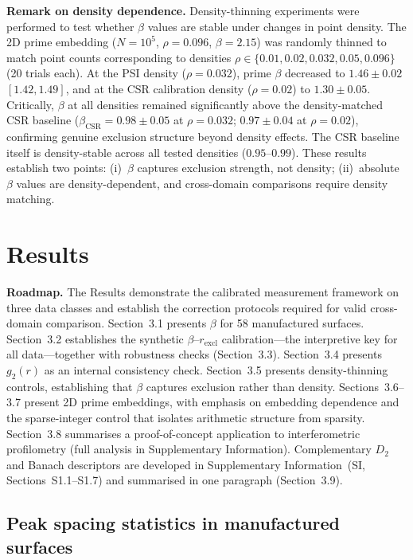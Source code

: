 \documentclass[final,3p,times,twocolumn]{elsarticle}
\theoremstyle{definition}
\begin{document}
\textbf{Remark on density dependence.} Density-thinning experiments were
performed to test whether $\beta$ values are stable under changes in
point density. The 2D prime embedding ($N=10^5$, $\rho=0.096$,
$\beta=2.15$) was randomly thinned to match point counts corresponding
to densities $\rho \in \{0.01, 0.02, 0.032, 0.05, 0.096\}$ (20 trials
each). At the PSI density ($\rho=0.032$), prime $\beta$ decreased to
$1.46\pm0.02$ $[1.42,1.49]$, and at the CSR calibration density
($\rho=0.02$) to $1.30\pm0.05$. Critically, $\beta$ at all densities
remained significantly above the density-matched CSR baseline
($\beta_{\text{CSR}}=0.98\pm0.05$ at $\rho=0.032$; $0.97\pm0.04$ at
$\rho=0.02$), confirming genuine exclusion structure beyond density
effects. The CSR baseline itself is density-stable across all tested
densities ($0.95$--$0.99$). These results establish two points:
(i)~$\beta$ captures exclusion strength, not density; (ii)~absolute
$\beta$ values are density-dependent, and cross-domain comparisons
require density matching.

\section{Results}

\textbf{Roadmap.} The Results demonstrate the calibrated measurement
framework on three data classes and establish the correction protocols
required for valid cross-domain comparison. Section~3.1 presents
$\beta$ for 58 manufactured surfaces. Section~3.2 establishes the
synthetic $\beta$--$r_{\text{excl}}$ calibration---the interpretive
key for all data---together with robustness checks (Section~3.3).
Section~3.4 presents $g_2(r)$ as an internal consistency check.
Section~3.5 presents density-thinning controls, establishing that
$\beta$ captures exclusion rather than density. Sections~3.6--3.7
present 2D prime embeddings, with emphasis on embedding dependence
and the sparse-integer control that isolates arithmetic structure
from sparsity. Section~3.8 summarises a proof-of-concept application
to interferometric profilometry (full analysis in Supplementary
Information). Complementary $D_2$ and Banach descriptors are
developed in Supplementary Information~(SI, Sections~S1.1--S1.7)
and summarised in one paragraph (Section~3.9).

\subsection{Peak spacing statistics in manufactured surfaces}
\label{sec:fv-surfaces}
\end{document}
